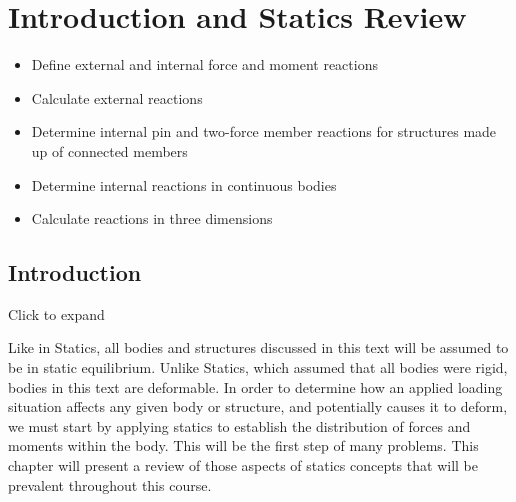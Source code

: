 \documentclass[
  letterpaper,
  DIV=11,
  numbers=noendperiod]{scrreprt}
\providecommand{\tightlist}{%
  \setlength{\itemsep}{0pt}\setlength{\parskip}{0pt}}\usepackage{longtable,booktabs,array}
\begin{document}

\chapter{Introduction and Statics Review}\label{sec-stress}

\begin{tcolorbox}[enhanced jigsaw, colback=white, colframe=quarto-callout-note-color-frame, leftrule=.75mm, opacitybacktitle=0.6, colbacktitle=quarto-callout-note-color!10!white, arc=.35mm, bottomrule=.15mm, breakable, title={Learning Objectives}, left=2mm, titlerule=0mm, toptitle=1mm, toprule=.15mm, opacityback=0, rightrule=.15mm, coltitle=black, bottomtitle=1mm]

\begin{itemize}
\tightlist
\item
  Define external and internal force and moment reactions
\item
  Calculate external reactions
\item
  Determine internal pin and two-force member reactions for structures
  made up of connected members
\item
  Determine internal reactions in continuous bodies
\item
  Calculate reactions in three dimensions
\end{itemize}

\end{tcolorbox}

\section*{Introduction}\label{introduction-1}


Click to expand

Like in Statics, all bodies and structures discussed in this text will
be assumed to be in static equilibrium. Unlike Statics, which assumed
that all bodies were rigid, bodies in this text are deformable. In order
to determine how an applied loading situation affects any given body or
structure, and potentially causes it to deform, we must start by
applying statics to establish the distribution of forces and moments
within the body. This will be the first step of many problems. This
chapter will present a review of those aspects of statics concepts that
will be prevalent throughout this course.
\end{document}
